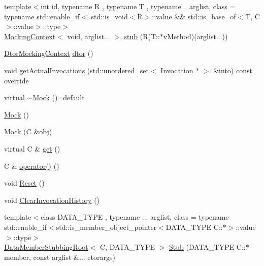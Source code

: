 \begin{DoxyCompactItemize}
\item 
{\footnotesize template$<$int id, typename R , typename T , typename... arglist, class  = typename std\+::enable\+\_\+if$<$                std\+::is\+\_\+void$<$\+R$>$\+::value \&\& std\+::is\+\_\+base\+\_\+of$<$\+T, C$>$\+::value$>$\+::type$>$ }\\\mbox{\hyperlink{classfakeit_1_1MockingContext}{Mocking\+Context}}$<$ void, arglist... $>$ \mbox{\hyperlink{classfakeit_1_1Mock_aeedcaacc82d12295f11c3fc454b75554}{stub}} (R(T\+::$\ast$v\+Method)(arglist...))
\item 
\mbox{\hyperlink{classfakeit_1_1DtorMockingContext}{Dtor\+Mocking\+Context}} \mbox{\hyperlink{classfakeit_1_1Mock_a5c25c5db6e0e1b955137a1330f7348b9}{dtor}} ()
\item 
void \mbox{\hyperlink{classfakeit_1_1Mock_a107ca653b36eb6f72bf9d5acb13c26d8}{get\+Actual\+Invocations}} (std\+::unordered\+\_\+set$<$ \mbox{\hyperlink{structfakeit_1_1Invocation}{Invocation}} $\ast$ $>$ \&into) const override
\item 
virtual \mbox{\hyperlink{classfakeit_1_1Mock_af5ecff29779ab75289c260d0a56705ab}{$\sim$\+Mock}} ()=default
\item 
\mbox{\hyperlink{classfakeit_1_1Mock_af7a86c609a2ee704ee09de6db066c7f4}{Mock}} ()
\item 
\mbox{\hyperlink{classfakeit_1_1Mock_aa474a0d6c7447608253a0fc306eb6ef5}{Mock}} (C \&obj)
\item 
virtual C \& \mbox{\hyperlink{classfakeit_1_1Mock_a139a126982e65ed43a69b21a3a8a6d35}{get}} ()
\item 
C \& \mbox{\hyperlink{classfakeit_1_1Mock_a128ca35e5c7648e0612f017cb7076498}{operator()}} ()
\item 
void \mbox{\hyperlink{classfakeit_1_1Mock_a69c66fc56c032205843b05d91f339a55}{Reset}} ()
\item 
void \mbox{\hyperlink{classfakeit_1_1Mock_ac9e21ef9c73c735287c7fd3dd110aafc}{Clear\+Invocation\+History}} ()
\item 
{\footnotesize template$<$class D\+A\+T\+A\+\_\+\+T\+Y\+PE , typename ... arglist, class  = typename std\+::enable\+\_\+if$<$std\+::is\+\_\+member\+\_\+object\+\_\+pointer$<$\+D\+A\+T\+A\+\_\+\+T\+Y\+P\+E C\+::$\ast$$>$\+::value$>$\+::type$>$ }\\\mbox{\hyperlink{classfakeit_1_1DataMemberStubbingRoot}{Data\+Member\+Stubbing\+Root}}$<$ C, D\+A\+T\+A\+\_\+\+T\+Y\+PE $>$ \mbox{\hyperlink{classfakeit_1_1Mock_ae210824251ca071933f8a651bbe56047}{Stub}} (D\+A\+T\+A\+\_\+\+T\+Y\+PE C\+::$\ast$member, const arglist \&... ctorargs)

\end{DoxyCompactItemize}
